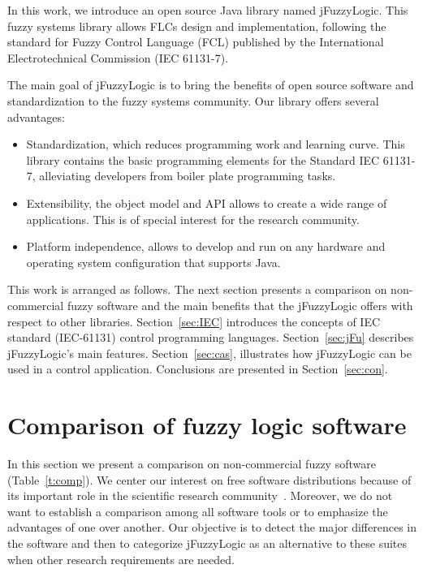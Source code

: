 \documentclass[11pt,twoside]{article}
\begin{document}
\begin{multicols}{2}
In this work, we introduce an open source Java library named jFuzzyLogic. 
This fuzzy systems library allows FLCs design and implementation, following the standard for Fuzzy Control Language (FCL) published by the International Electrotechnical Commission (IEC 61131-7)\cite{IEC}. 

The main goal of jFuzzyLogic is to bring the benefits of open source software and standardization to the fuzzy systems community. Our library offers several advantages:

\begin{itemize}

	\item Standardization, which reduces programming work and learning curve. This library contains the basic programming elements for the Standard IEC 61131-7, alleviating developers from boiler plate programming tasks.

	\item Extensibility, the object model and API allows to create a wide range of applications. This is of special interest for the research community.

	\item Platform independence, allows to develop and run on any hardware and operating system configuration that supports Java.

\end{itemize}

This work is arranged as follows.
The next section presents a comparison on non-commercial fuzzy software and the main benefits that the jFuzzyLogic offers with respect to other libraries. 
Section~\ref{sec:IEC} introduces the concepts of IEC standard (IEC-61131) control programming languages.
Section~\ref{sec:jFu} describes jFuzzyLogic's main features. 
Section~\ref{sec:cas}, illustrates how jFuzzyLogic can be used in a control application.
Conclusions are presented in Section~\ref{sec:con}.

\section{Comparison of fuzzy logic software\label{sec:stu}}

In this section we present a comparison on non-commercial fuzzy software (Table~\ref{t:comp}).
We center our interest on free software distributions because of its important role in the scientific research community~\cite{Sonnenburg07}.
Moreover, we do not want to establish a comparison among all software tools or to emphasize the advantages of one over another.
Our objective is to detect the major differences in the software and then to categorize jFuzzyLogic as an alternative to these suites when other research requirements are needed.


\end{multicols}
\end{document}
